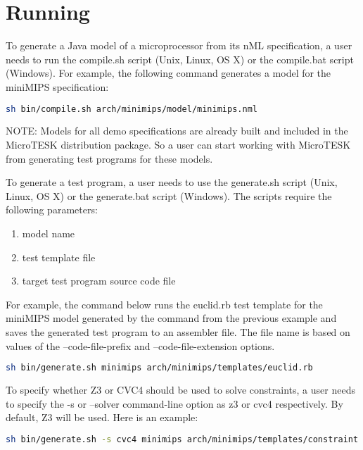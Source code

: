 \documentclass[oneside,final,14pt]{extreport}
\begin{document}
\section{Running}

To generate a Java model of a microprocessor from its nML specification, a user
needs to run the compile.sh script (Unix, Linux, OS X) or the compile.bat script
(Windows). For example, the following command generates a model for the miniMIPS
specification:

\begin{lstlisting}[language=bash]
sh bin/compile.sh arch/minimips/model/minimips.nml
\end{lstlisting}

NOTE: Models for all demo specifications are already built and included in the
MicroTESK distribution package. So a user can start working with MicroTESK from
generating test programs for these models.

To generate a test program, a user needs to use the generate.sh script
(Unix, Linux, OS X) or the generate.bat script (Windows). The scripts
require the following parameters:

\begin{enumerate}
  \item model name
  \item test template file
  \item target test program source code file
\end{enumerate}

For example, the command below runs the euclid.rb test template for
the miniMIPS model generated by the command from the previous example and saves
the generated test program to an assembler file. The file name is based on values
of the --code-file-prefix and --code-file-extension options.

\begin{lstlisting}[language=bash]
sh bin/generate.sh minimips arch/minimips/templates/euclid.rb
\end{lstlisting}

To specify whether Z3 or CVC4 should be used to solve constraints,
a user needs to specify the -s or --solver command-line option as z3
or cvc4 respectively. By default, Z3 will be used. Here is an example:

\begin{lstlisting}[language=bash]
sh bin/generate.sh -s cvc4 minimips arch/minimips/templates/constraint.rb
\end{lstlisting}
\end{document}
